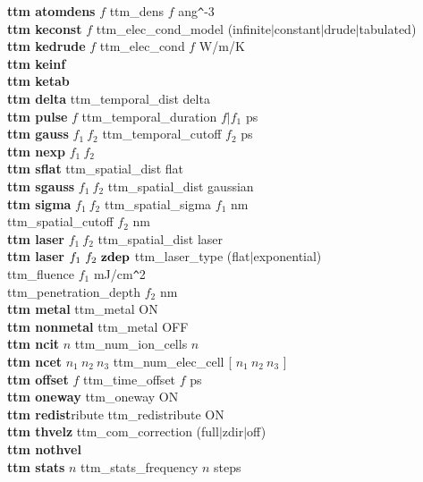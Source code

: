 \begin{tabbing}
\>    {\bf ttm atomdens} $f$ \> ttm\_dens $f$ ang\verb#^#-3 \\
\>    {\bf ttm keconst} $f$ \> ttm\_elec\_cond\_model (infinite$|$constant$|$drude$|$tabulated) \\
\>    {\bf ttm kedrude} $f$ \> ttm\_elec\_cond $f$ W/m/K \\
\>    {\bf ttm keinf} \> \\
\>    {\bf ttm ketab} \> \\
\>    {\bf ttm delta} \> ttm\_temporal\_dist delta \\
\>    {\bf ttm pulse} $f$ \> ttm\_temporal\_duration $f|f_{1}$ ps \\
\>    {\bf ttm gauss} $f_{1}~f_{2}$ \> ttm\_temporal\_cutoff $f_{2}$ ps \\
\>    {\bf ttm nexp} $f_{1}~f_{2}$ \> \\
\>    {\bf ttm sflat} \> ttm\_spatial\_dist flat \\
\>    {\bf ttm sgauss} $f_{1}~f_{2}$ \> ttm\_spatial\_dist gaussian \\
\>    {\bf ttm sigma} $f_{1}~f_{2}$ \> ttm\_spatial\_sigma $f_{1}$ nm \\
\> \> ttm\_spatial\_cutoff $f_{2}$ nm \\
\>    {\bf ttm laser} $f_{1}~f_{2}$ \> ttm\_spatial\_dist laser \\
\>    {\bf ttm laser} $f_{1}~f_{2}~{\bf zdep} $ \> ttm\_laser\_type (flat$|$exponential) \\
\> \> ttm\_fluence $f_{1}$ mJ/cm\verb#^#2 \\
\> \> ttm\_penetration\_depth $f_{2}$ nm \\
\>    {\bf ttm metal} \> ttm\_metal ON \\
\>    {\bf ttm nonmetal} \> ttm\_metal OFF \\
\>    {\bf ttm ncit} $n$ \> ttm\_num\_ion\_cells $n$ \\
\>    {\bf ttm ncet} $n_{1}~n_{2}~n_{3}$ \> ttm\_num\_elec\_cell [ $n_{1}~n_{2}~n_{3}$ ] \\
\>    {\bf ttm offset} $f$ \> ttm\_time\_offset $f$ ps \\
\>    {\bf ttm oneway} \> ttm\_oneway ON \\
\>    {\bf ttm redist}ribute \> ttm\_redistribute ON \\
\>    {\bf ttm thvelz} \> ttm\_com\_correction (full$|$zdir$|$off) \\
\>    {\bf ttm nothvel} \> \\
\>    {\bf ttm stats} $n$ \> ttm\_stats\_frequency $n$ steps \\

\end{tabbing}
